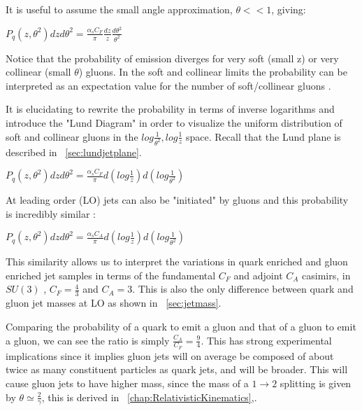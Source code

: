 It is useful to assume the small angle approximation, $\theta << 1$, giving:\newline


$P_q(z,\theta^2) dz d \theta^2 = \frac{\alpha_s C_F}{\pi}  \frac{dz}{z} \frac{d \theta^2}{ \theta^2}  $\newline

Notice that the probability of emission diverges for very soft (small z) or very collinear (small $\theta$) gluons. In the soft and collinear limits the probability can be interpreted as an expectation value for the number of soft/collinear gluons \cite{Larkoski:2017fip}.

It is elucidating to rewrite the probability in terms of inverse logarithms and introduce the "Lund Diagram" in order to visualize the uniform distribution of soft and collinear gluons in the $log \frac{1}{ \theta^2} , log\frac{1}{z} $ space. Recall that the Lund plane is described in ~\ref{sec:lundjetplane}.




$P_q(z,\theta^2) dz d \theta^2 = \frac{\alpha_s C_F}{\pi} d( log\frac{1}{z}  ) d(log \frac{1}{ \theta^2})  $\newline

At leading order (LO) jets can also be "initiated" by gluons and this probability is incredibly similar :


$P_q(z,\theta^2) dz d \theta^2 = \frac{\alpha_s C_A}{\pi} d( log\frac{1}{z}  ) d(log \frac{1}{ \theta^2})  $\newline


This similarity allows us to interpret the variations in quark enriched and gluon enriched jet samples in terms of the fundamental $C_F$ and adjoint $C_A$ casimirs, in $SU(3)$ ,   $C_F = \frac{4}{3}$ and $C_A=3$. This is also the only difference between quark and gluon jet masses at LO as shown in ~\ref{sec:jetmass}.


Comparing the probability of a quark to emit a gluon and that of a gluon to emit a gluon, we can see the ratio is simply $\frac{C_A}{C_F} =\frac{9}{4} $. This has strong experimental implications since it implies gluon jets will on average be composed of about twice as many constituent particles as quark jets, and will be broader. This will cause gluon jets to have higher mass, since the mass of a $1 \rightarrow 2 $ splitting is given by $\theta \simeq \frac{2}{\gamma} $, this is derived in ~\ref{chap:RelativisticKinematics},.




